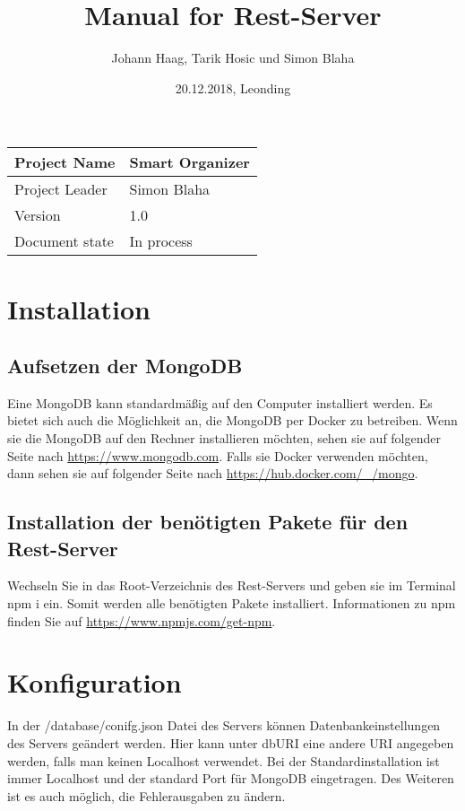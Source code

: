 \documentclass[12pt]{scrartcl}
\title{Manual for Rest-Server}
\author{Johann Haag, Tarik Hosic und Simon Blaha}
\date{20.12.2018, Leonding}
\begin{document}
    \maketitle
    \begin{flushleft}
    \begin{tabular}{|l|l|}
    \hline
    Project Name & Smart Organizer \\ \hline
    Project Leader & Simon Blaha \\ \hline
    Version & 1.0\\ \hline
    Document state & In process \\ \hline
    \end{tabular}
    \end{flushleft}

    \pagebreak
    \tableofcontents
    \pagebreak

    \section{Installation}
    \subsection{Aufsetzen der MongoDB}
        Eine MongoDB kann standardmäßig auf den Computer installiert werden. Es bietet sich auch die Möglichkeit an, die MongoDB per Docker zu betreiben.
        Wenn sie die MongoDB auf den Rechner installieren möchten, sehen sie auf folgender Seite nach \url{https://www.mongodb.com}.
        Falls sie Docker verwenden möchten, dann sehen sie auf folgender Seite nach \url{https://hub.docker.com/_/mongo}.

    \subsection{Installation der benötigten Pakete für den Rest-Server}
        Wechseln Sie in das Root-Verzeichnis des Rest-Servers und geben sie im Terminal npm i ein.
        Somit werden alle benötigten Pakete installiert.
        Informationen zu npm finden Sie auf \url{https://www.npmjs.com/get-npm}.

    \section{Konfiguration}
        In der /database/conifg.json Datei des Servers können Datenbankeinstellungen des Servers geändert werden.
        Hier kann unter dbURI eine andere URI angegeben werden, falls man keinen Localhost verwendet.
        Bei der Standardinstallation ist immer Localhost und der standard Port für MongoDB eingetragen.
        Des Weiteren ist es auch möglich, die Fehlerausgaben zu ändern.
\end{document}

